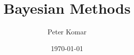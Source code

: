 \documentclass[10pt,oneside]{article}
\author{Peter Komar}
\title{Bayesian Methods}
\date{\today}
\begin{document}
\newcommand{\bel}{\begin{equation}}
\newcommand{\eel}{\end{equation}}
\newcommand{\be}{\begin{equation*}}
\newcommand{\ee}{\end{equation*}}

\newcommand{\bal}{\begin{eqnarray}}
\newcommand{\eal}{\end{eqnarray}}
\newcommand{\ba}{\begin{eqnarray*}}
\newcommand{\ea}{\end{eqnarray*}}

\newcommand{\ket}[1]{| #1 \rangle}
\newcommand{\Ket}[1]{\left| #1 \right\rangle}
\newcommand{\bra}[1]{\langle #1 |}
\newcommand{\Bra}[1]{\left\langle #1 \right|}

\newcommand{\no}{\noindent}

\newcommand{\ev}[1]{\langle #1 \rangle}
\newcommand{\Ev}[1]{\left\langle #1 \right\rangle}
\newcommand{\Tr}{\text{Tr}\,}
\newcommand{\T}{^\top}
\newcommand{\+}{^\dagger}
\newcommand{\s}{^\ast}
\newcommand{\PP}{\mathcal{P}}
\newcommand{\eqE}{= \!\!\!\!\!^{{}^{E}}\,}

\renewcommand{\d}[1]{\!d #1 \;}

\newcommand{\bE}{{\mathbf E}}
\newcommand{\bB}{{\mathbf B}}
\newcommand{\bF}{{\mathbf F}}
\newcommand{\bJ}{{\mathbf J}}
\newcommand{\bv}{{\mathbf v}}
\newcommand{\eps}{\varepsilon}
\newcommand{\br}{\mathbf r}
\newcommand{\bk}{\mathbf k}
\newcommand{\hatx}{\hat{\mathbf{x}}}
\newcommand{\haty}{\hat{\mathbf{y}}}
\newcommand{\hatz}{\hat{\mathbf{z}}}

\newcommand\independent{\protect\mathpalette{\protect\independenT}{\perp}}
\def\independenT#1#2{\mathrel{\rlap{$#1#2$}\mkern2mu{#1#2}}}


\renewcommand{\vec}[1]{{\bf #1}}
\newcommand{\mat}[1]{{\bf #1}}
\end{document}
